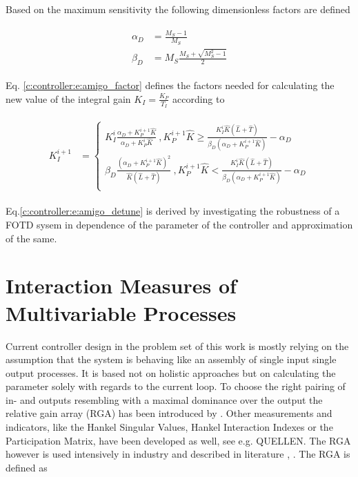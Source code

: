 Based on the maximum sensitivity the following dimensionless factors are defined 

\begin{align}
\begin{split}
\alpha_D &= \frac{M_S-1}{M_S}\\
\beta_D &= M_S \frac{M_S+\sqrt{M_S^2 -1}}{2} 
\end{split}
\label{c:controller:e:amigo_factor}
\end{align}

Eq. \ref{c:controller:e:amigo_factor} defines the factors needed for calculating the new value of the integral gain $K_I = \frac{K_P}{T_I}$ according to

\begin{align}
\begin{split}
K_I^{i+1} &= \begin{cases}
	K_I^i \frac{\alpha_D + K_P^{i+1} \hat{K}}{\alpha_D + K_P^{i} \hat{K}} ~, K_P^{i+1} \hat{K} \geq \frac{K_I^{i}\hat{K}\left(\hat{L}+\hat{T}\right)}{\beta_D \left( \alpha_D + K_P^{i+1} \hat{K}\right)} - \alpha_D\\
	\beta_D \frac{\left( \alpha_D + K_P^{i+1} \hat{K} \right)^2}{\hat{K} \left( \hat{L}+ \hat{T} \right)}~, K_P^{i+1} \hat{K} < \frac{K_I^{i}\hat{K}\left(\hat{L}+\hat{T}\right)}{\beta_D \left( \alpha_D + K_P^{i+1} \hat{K}\right)} - \alpha_D\\
\end{cases}
\end{split}
\label{c:controller:e:amigo_detune}
\end{align} 

Eq.\ref{c:controller:e:amigo_detune} is derived by investigating the robustness of a FOTD sysem in dependence of the parameter of the controller and approximation of the same.\\

\section{Interaction Measures of Multivariable Processes} %
\label{c:controller:s:rga}

Current controller design in the problem set of this work is mostly relying on the assumption that the system is behaving like an assembly of single input single output processes. It is based not on holistic approaches but on calculating the parameter solely with regards to the current loop. To choose the right pairing of in- and outputs resembling with a maximal dominance over the output the relative gain array (RGA) has been introduced by \cite{Bristol1966}. Other measurements and indicators, like the Hankel Singular Values, Hankel Interaction Indexes or the Participation Matrix, have been developed as well, see e.g. QUELLEN. The RGA however is used intensively in industry and described in literature \cite[p. 88 ff.]{Skogestad2005}, \cite[p.219 ff.]{Glad2000}. The RGA is defined as

